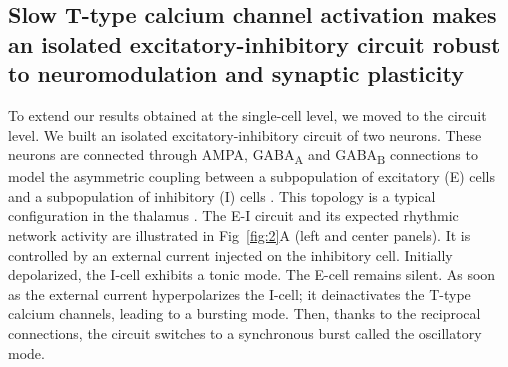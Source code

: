 \subsection{Slow T-type calcium channel activation makes an isolated excitatory-inhibitory circuit  robust to neuromodulation and synaptic plasticity }
To extend our results obtained at the single-cell level, we moved to the circuit level. We built an isolated excitatory-inhibitory circuit of two neurons. These neurons are connected through AMPA, GABA\textsubscript{A} and GABA\textsubscript{B} connections to model the asymmetric coupling between a subpopulation of excitatory (E) cells and a subpopulation of inhibitory (I) cells 
\citep{guillery_thalamic_2002, mccormick_brain_2015}. This topology is a typical configuration in  the thalamus \citep{mccormick_sleep_1997, sherman_functional_1996}. The E-I circuit and its expected rhythmic network activity are  illustrated in Fig~\ref{fig:2}A (left and center panels). It is controlled by an external current injected on the inhibitory cell. Initially depolarized, the I-cell exhibits a tonic mode. The E-cell remains silent. As soon as the external current hyperpolarizes the I-cell; it deinactivates the T-type calcium channels, leading to a bursting mode. Then, thanks to the reciprocal connections, the circuit switches to a synchronous burst called the oscillatory mode. 

